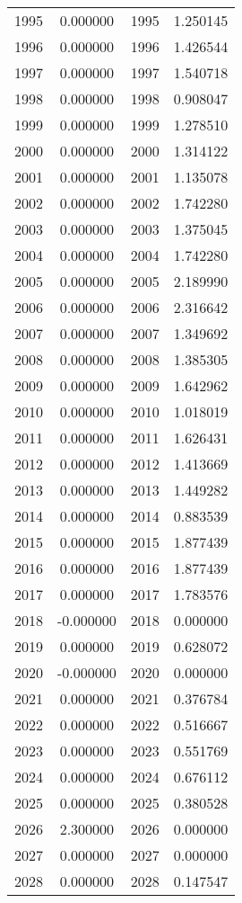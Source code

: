 \documentclass[12pt]{article}
\begin{document}
\begin{longtable}{@{}cccc@{}}
1995 & 0.000000 & 1995 & 1.250145 \\
1996 & 0.000000 & 1996 & 1.426544 \\
1997 & 0.000000 & 1997 & 1.540718 \\
1998 & 0.000000 & 1998 & 0.908047 \\
1999 & 0.000000 & 1999 & 1.278510 \\
2000 & 0.000000 & 2000 & 1.314122 \\
2001 & 0.000000 & 2001 & 1.135078 \\
2002 & 0.000000 & 2002 & 1.742280 \\
2003 & 0.000000 & 2003 & 1.375045 \\
2004 & 0.000000 & 2004 & 1.742280 \\
2005 & 0.000000 & 2005 & 2.189990 \\
2006 & 0.000000 & 2006 & 2.316642 \\
2007 & 0.000000 & 2007 & 1.349692 \\
2008 & 0.000000 & 2008 & 1.385305 \\
2009 & 0.000000 & 2009 & 1.642962 \\
2010 & 0.000000 & 2010 & 1.018019 \\
2011 & 0.000000 & 2011 & 1.626431 \\
2012 & 0.000000 & 2012 & 1.413669 \\
2013 & 0.000000 & 2013 & 1.449282 \\
2014 & 0.000000 & 2014 & 0.883539 \\
2015 & 0.000000 & 2015 & 1.877439 \\
2016 & 0.000000 & 2016 & 1.877439 \\
2017 & 0.000000 & 2017 & 1.783576 \\
2018 & -0.000000 & 2018 & 0.000000 \\
2019 & 0.000000 & 2019 & 0.628072 \\
2020 & -0.000000 & 2020 & 0.000000 \\
2021 & 0.000000 & 2021 & 0.376784 \\
2022 & 0.000000 & 2022 & 0.516667 \\
2023 & 0.000000 & 2023 & 0.551769 \\
2024 & 0.000000 & 2024 & 0.676112 \\
2025 & 0.000000 & 2025 & 0.380528 \\
2026 & 2.300000 & 2026 & 0.000000 \\
2027 & 0.000000 & 2027 & 0.000000 \\
2028 & 0.000000 & 2028 & 0.147547 \\

\end{longtable}
\end{document}
